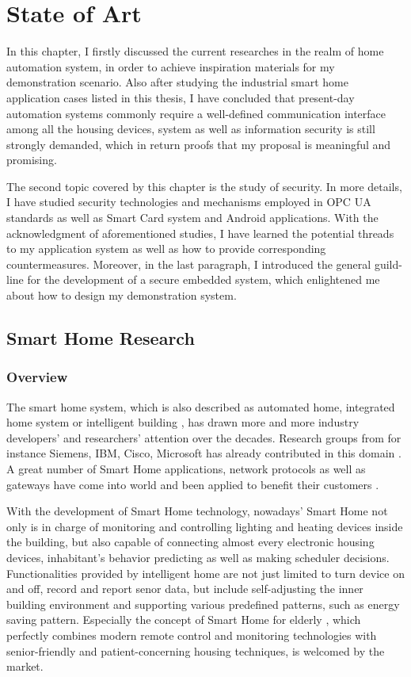 \chapter{State of Art}
In this chapter, I firstly discussed the current researches in the realm of home automation system, in order to achieve inspiration materials for my demonstration scenario. Also after studying the industrial smart home application cases listed in this thesis, I have concluded that present-day automation systems commonly require a well-defined communication interface among all the housing devices, system as well as information security is still strongly demanded, which in return proofs that my proposal is meaningful and promising.  

The second topic covered by this chapter is the study of security. In more details, I have studied security   technologies and mechanisms employed in OPC UA standards as well as Smart Card system and Android applications. With the acknowledgment of aforementioned studies, I have learned the potential threads to my application system as well as how to provide corresponding countermeasures. Moreover, in the last paragraph, I introduced  the general guild-line for the development of a secure embedded system, which enlightened me about how to design my demonstration system.
 
\section{Smart Home Research}
\subsection{Overview}
The smart home system, which is also described as automated home, integrated home system or intelligent building \cite{smart_home_concept}, has drawn more and more industry developers' and researchers' attention over the decades. Research groups from for instance Siemens, IBM, Cisco, Microsoft has already contributed in this domain \cite{smart_home_research}. A great number of Smart Home applications, network protocols as well as gateways have come into world and been applied to benefit their customers \cite{smart_home_for_gateway}.

With the development of Smart Home technology, nowadays' Smart Home not only is in charge of monitoring and controlling lighting and heating devices inside the building, but also capable of connecting almost every electronic housing devices, inhabitant's behavior predicting as well as making scheduler decisions. Functionalities provided by intelligent home are not just limited to turn device on and off, record and report senor data, but include self-adjusting the inner building environment and supporting various predefined patterns, such as energy saving pattern. Especially the concept of Smart Home for elderly \cite{smart_home_for_old}, which perfectly combines modern remote control and monitoring technologies with senior-friendly and patient-concerning housing techniques, is welcomed by the market. 

